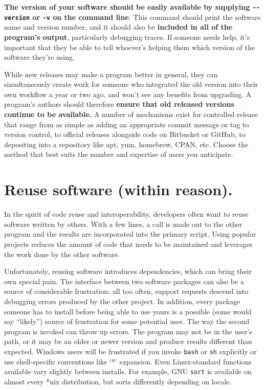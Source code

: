 \documentclass[10pt,letterpaper]{article}
\begin{document}
\textbf{The version of your software should be easily available by 
supplying \texttt{-\/-version} or \texttt{-v} on the command line}. This command should print
the software name and version number, and it should
also be \textbf{included in all of the program's output}, particularly debugging
traces.  If someone needs help, it's important that they be able to tell
whoever's helping them which version of the software they're using.

While new releases may make a program better in general,
they can simultaneously create work for someone
who integrated the old version into their own workflow a year or two ago,
and won't see any benefits from upgrading.
A program's authors should therefore \textbf{ensure that old released versions
continue to be available.}
A number of mechanisms exist for
controlled release that range from as simple as adding an appropriate
commit message or tag to version control, to official releases alongside
code on Bitbucket or GitHub, to depositing into a
repository like apt, yum, homebrew, CPAN, etc. Choose the method that
best suits the number and expertise of users you anticipate.

\section{Reuse software (within reason).}

In the spirit of code reuse and interoperability, developers often want
to reuse software written by others. 
With a few lines, a call
is made out to the other program and the results are incorporated into the
primary script. Using popular projects reduces the amount of code that
needs to be maintained and leverages the work done by the other software.

Unfortunately, reusing software introduces dependencies, which can
bring their own special pain.  The interface between two software
packages can also be a source of considerable frustration: all too
often, support requests descend into debugging errors produced by the
other project. 
In addition, every package someone has to install
before being able to use yours is a
possible (some would say ``likely'') source of frustration for some
potential user. The way the second program is invoked can throw up errors.
The program may not be in the user's path, or it may be an
older or newer version and produce results different than expected.
Windows users will be frustrated if you invoke \texttt{bash} or \texttt{sh} explicitly or
use shell-specific conventions like `*' expansion.
Even Linux-standard functions available vary slightly between
installs. For example, GNU \texttt{sort} is available on almost every
*nix distribution, but sorts differently depending on locale.
\end{document}
